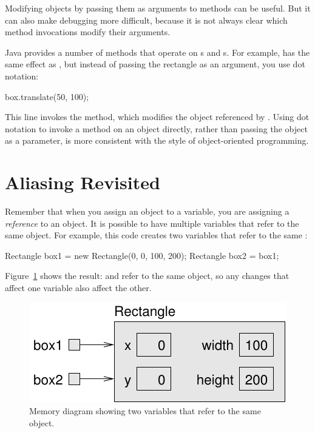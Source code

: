 
Modifying objects by passing them as arguments to methods can be useful.
But it can also make debugging more difficult, because it is not always clear which method invocations modify their arguments.

Java provides a number of methods that operate on s and s.
For example,  has the same effect as , but instead of passing the rectangle as an argument, you use dot notation:

\begin{code}
box.translate(50, 100);
\end{code}


This line invokes the  method, which modifies the object referenced by .
Using dot notation to invoke a method on an object directly, rather than passing the object as a parameter, is more consistent with the style of object-oriented programming.


\section{Aliasing Revisited}
\label{aliasing}


Remember that when you assign an object to a variable, you are assigning a {\em reference} to an object.
It is possible to have multiple variables that refer to the same object.
For example, this code creates two variables that refer to the same :

\begin{code}
Rectangle box1 = new Rectangle(0, 0, 100, 200);
Rectangle box2 = box1;
\end{code}

Figure~\ref{fig.aliasing} shows the result:  and  refer to the same object, so any changes that affect one variable also affect the other.

\begin{figure}[!ht]
\begin{center}
\includegraphics{figs/aliasing.pdf}
\caption{Memory diagram showing two variables that refer to the same  object.}
\label{fig.aliasing}
\end{center}
\end{figure}

